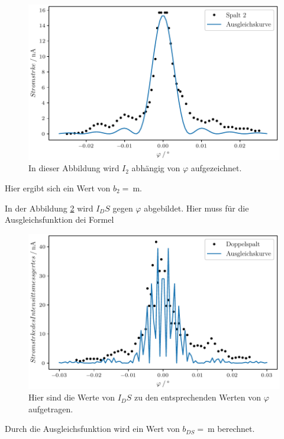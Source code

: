 \begin{figure}[H]
  \centering
  \includegraphics{plot1.pdf}
  \caption{In dieser Abbildung wird $I_2$ abhängig von $\varphi$ aufgezeichnet.}
  \label{fig:Spalt2}
\end{figure}

Hier ergibt sich ein Wert von $b_2=\qty{}{\meter}$.

In der Abbildung \ref{fig:Doppelspalt} wird $I_DS$ gegen $\varphi$ abgebildet.
Hier muss für die Ausgleichsfunktion dei Formel



\begin{figure}[H]
  \centering
  \includegraphics{plot2.pdf}
  \caption{Hier sind die Werte von $I_DS$ zu den entsprechenden Werten von $\varphi$ aufgetragen.}
  \label{fig:Doppelspalt}
\end{figure}

Durch die Ausgleichsfunktion wird ein Wert von $b_{DS}=\qty{}{\meter}$ berechnet.
